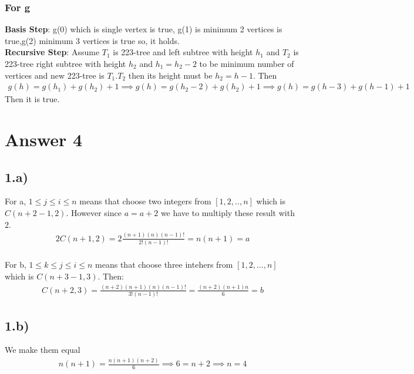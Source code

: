 \documentclass[12pt]{article}
\begin{document}
\subsubsection*{For g}
\textbf{Basis Step}: g(0) which is single vertex is true, g(1) is minimum 2 vertices is true,g(2) minimum 3 vertices is true so, it holds. \\
\textbf{Recursive Step}: Assume $T_1$ is 223-tree and left subtree with height $h_1$ and $T_2$ is 223-tree right subtree with height $h_2$ and $h_1=h_2-2$ to be minimum number of vertices and new 223-tree is $T_1.T_2$ then its height must be $h_2=h-1$. Then
\begin{equation} 
\begin{split} 
    g(h) = g(h_1)+g(h_2)+1 \implies g(h) = g(h_2-2)+g(h_2) +1 \implies g(h)=g(h-3)+g(h-1)+1
\end{split}
\end{equation}
Then it is true.
\section*{Answer 4}
\subsection*{1.a)}
For a,  $1\leq j \leq i \leq n$ means that choose two integers from $[1,2,..,n]$ which is $C(n+2-1,2)$. However since $a=a+2$ we have to multiply these result with 2.
\begin{equation} 
\begin{split} 
        2C(n+1,2) = 2\frac{(n+1)(n)(n-1)!}{2!(n-1)!}=n(n+1)=a
\end{split}
\end{equation} \\
For b, $1\leq k \leq j \leq i \leq n$ means that choose three intehers from $[1,2,...,n]$ which is $C(n+3-1,3)$. Then:
\begin{equation} 
\begin{split} 
  C(n+2,3) = \frac{(n+2)(n+1)(n)(n-1)!}{3!(n-1)!} = \frac{(n+2)(n+1)n}{6} = b  
\end{split}
\end{equation} 
\subsection*{1.b)}
We make them equal 
\begin{equation} 
\begin{split} 
    n(n+1) = \frac{n(n+1)(n+2)}{6} \implies 6 = n+2 \implies n=4
\end{split}
\end{equation}
\end{document}
